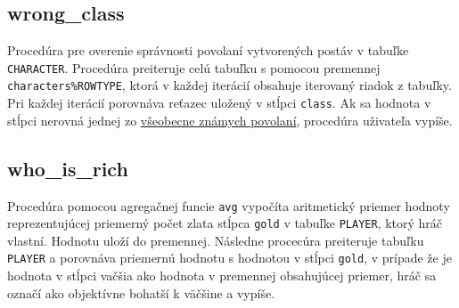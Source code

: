 \documentclass[a4paper,12pt,oneside]{article}
\begin{document}
\subsection{wrong\_class}
Procedúra pre overenie správnosti povolaní vytvorených postáv v tabuľke \texttt{CHARACTER}. Procedúra preiteruje celú tabuľku s pomocou premennej \texttt{characters\%ROWTYPE}, ktorá v každej iterácií obsahuje iterovaný riadok z tabuľky. Pri každej iterácií porovnáva reťazec uložený v stĺpci \texttt{class}. Ak sa hodnota v stĺpci nerovná jednej zo \href{https://www.dndbeyond.com/classes}{všeobecne známych povolaní}, procedúra uživateľa vypíše.

\subsection{who\_is\_rich}
Procedúra pomocou agregačnej funcie \texttt{avg} vypočíta aritmetický priemer hodnoty reprezentujúcej priemerný počet zlata stĺpca \texttt{gold} v tabuľke \texttt{PLAYER}, ktorý hráč vlastní. Hodnotu uloží do premennej. Následne procecúra preiteruje tabuľku \texttt{PLAYER} a porovnáva priemernú hodnotu s hodnotou v stĺpci \texttt{gold}, v prípade že je hodnota v stĺpci vačšia ako hodnota v premennej obsahujúcej priemer, hráč sa označí ako objektívne bohatší k väčšine a vypíše.
\end{document}

